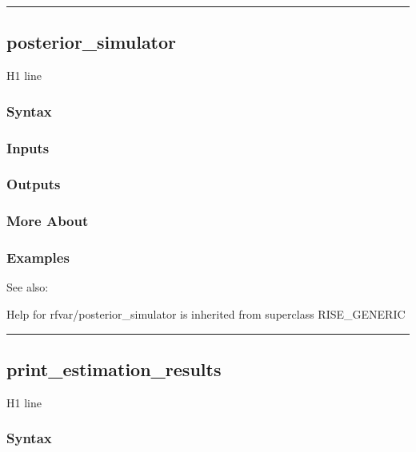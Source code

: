 \documentclass[letterpaper,10pt,english]{sphinxmanual}
\begin{document}
\bigskip\hrule{}\bigskip



\subsection{posterior\_simulator}
\label{classes/models/@rfvar/rfvar:posterior-simulator}\label{classes/models/@rfvar/rfvar:id82}
H1 line


\subsubsection{Syntax}
\label{classes/models/@rfvar/rfvar:id83}

\subsubsection{Inputs}
\label{classes/models/@rfvar/rfvar:id84}

\subsubsection{Outputs}
\label{classes/models/@rfvar/rfvar:id85}

\subsubsection{More About}
\label{classes/models/@rfvar/rfvar:id86}

\subsubsection{Examples}
\label{classes/models/@rfvar/rfvar:id87}
See also:

Help for rfvar/posterior\_simulator is inherited from superclass RISE\_GENERIC


\bigskip\hrule{}\bigskip



\subsection{print\_estimation\_results}
\label{classes/models/@rfvar/rfvar:print-estimation-results}\label{classes/models/@rfvar/rfvar:id88}
H1 line


\subsubsection{Syntax}
\label{classes/models/@rfvar/rfvar:id89}
\end{document}
